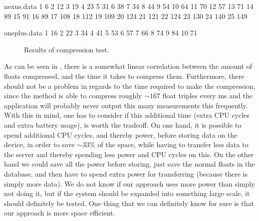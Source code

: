 \begin{filecontents}{nexus.data}
1 6
2 12
3 19
4 23
5 31
6 38
7 34
8 44
9 54
10 64
11 70
12 57
13 71
14 89
15 91
16 89
17 108
18 112
19 109
20 124
21 121
22 124
23 130
24 140
25 149
\end{filecontents}

\begin{filecontents}{oneplus.data}
1 16
2 22
3 34
4 41
5 53
6 57
7 66
8 74
9 84
10 71
\end{filecontents}

\begin{figure}[!htbp]
    \centering


    \caption{Results of compression test.}
    \label{fig:result_of_compression_test}
\end{figure}
\FloatBarrier

As can be seen in , there is a somewhat linear correlation between the amount of floats compressed, and the time it takes to compress them. Furthermore, there should not be a problem in regards to the time required to make the compression, since the method is able to compress roughly $\sim 167$ float triples every ms and the application will probably never output this many measurements this frequently. With this in mind, one has to consider if this additional time (extra CPU cycles and extra battery usage), is worth the tradeoff. On one hand, it is possible to spend additional CPU cycles, and thereby power, before storing data on the device, in order to save $\sim 33\%$ of the space, while having to transfer less data to the server and thereby spending less power and CPU cycles on this. On the other hand we could save all the power before storing, just save the normal floats in the database, and then have to spend extra power for transferring (because there is simply more data). We do not know if our approach uses more power than simply not doing it, but if the system should be expanded into something large scale, it should definitely be tested. One thing that we can definitely know for sure is that our approach is more space efficient. 

